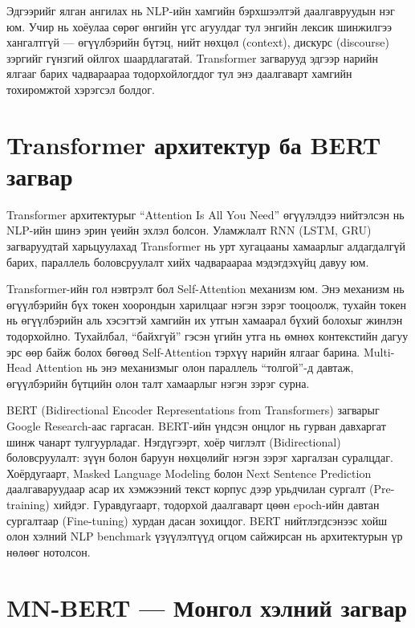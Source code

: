Эдгээрийг ялган ангилах нь NLP-ийн хамгийн бэрхшээлтэй даалгавруудын нэг юм.
Учир нь хоёулаа сөрөг өнгийн үгс агуулдаг тул энгийн лексик шинжилгээ
хангалтгүй --- өгүүлбэрийн бүтэц, нийт нөхцөл (context), дискурс (discourse)
зэргийг гүнзгий ойлгох шаардлагатай. Transformer загварууд эдгээр нарийн
ялгааг барих чадвараараа тодорхойлогддог тул энэ даалгаварт хамгийн тохиромжтой
хэрэгсэл болдог.

\section{Transformer архитектур ба BERT загвар}
\label{sec:transformer}

Transformer архитектурыг \cite{vaswani2017} ``Attention Is All You Need''
өгүүлэлдээ нийтэлсэн нь NLP-ийн шинэ эрин үеийн эхлэл болсон. Уламжлалт
RNN (LSTM, GRU) загваруудтай харьцуулахад Transformer нь урт хугацааны
хамаарлыг алдагдалгүй барих, параллель боловсруулалт хийх чадвараараа
мэдэгдэхүйц давуу юм.

Transformer-ийн гол нэвтрэлт бол Self-Attention механизм юм. Энэ механизм нь
өгүүлбэрийн бүх токен хоорондын харилцааг нэгэн зэрэг тооцоолж, тухайн токен
нь өгүүлбэрийн аль хэсэгтэй хамгийн их утгын хамаарал бүхий болохыг жинлэн
тодорхойлно. Тухайлбал, ``байхгүй'' гэсэн үгийн утга нь өмнөх контекстийн дагуу
эрс өөр байж болох бөгөөд Self-Attention тэрхүү нарийн ялгааг барина.
Multi-Head Attention нь энэ механизмыг олон параллель ``толгой''-д давтаж,
өгүүлбэрийн бүтцийн олон талт хамаарлыг нэгэн зэрэг сурна.

BERT (Bidirectional Encoder Representations from Transformers) загварыг
\cite{devlin2019} Google Research-аас гаргасан. BERT-ийн үндсэн онцлог нь гурван
давхаргат шинж чанарт тулгуурладаг. Нэгдүгээрт, хоёр чиглэлт (Bidirectional)
боловсруулалт: зүүн болон баруун нөхцөлийг нэгэн зэрэг харгалзан суралцдаг.
Хоёрдугаарт, Masked Language Modeling болон Next Sentence Prediction
даалгаваруудаар асар их хэмжээний текст корпус дээр урьдчилан сургалт
(Pre-training) хийдэг. Гуравдугаарт, тодорхой даалгаварт цөөн epoch-ийн давтан
сургалтаар (Fine-tuning) хурдан дасан зохицдог. BERT нийтлэгдсэнээс хойш олон
хэлний NLP benchmark үзүүлэлтүүд огцом сайжирсан нь архитектурын үр нөлөөг
нотолсон.

\section{MN-BERT --- Монгол хэлний загвар}

